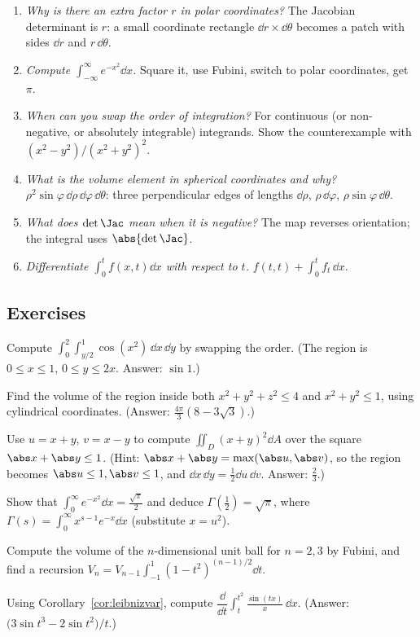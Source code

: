 \begin{interview}
\begin{enumerate}
  \item \emph{Why is there an extra factor $r$ in polar coordinates?} The Jacobian determinant is $r$: a small coordinate rectangle $\dd r\times\dd\theta$ becomes a patch with sides $\dd r$ and $r\,\dd\theta$.
  \item \emph{Compute $\int_{-\infty}^\infty e^{-x^2}\dd x$.} Square it, use Fubini, switch to polar coordinates, get $\pi$.
  \item \emph{When can you swap the order of integration?} For continuous (or non-negative, or absolutely integrable) integrands. Show the counterexample with $(x^2-y^2)/(x^2+y^2)^2$.
  \item \emph{What is the volume element in spherical coordinates and why?} $\rho^2\sin\varphi\,\dd\rho\,\dd\varphi\,\dd\theta$: three perpendicular edges of lengths $\dd\rho$, $\rho\,\dd\varphi$, $\rho\sin\varphi\,\dd\theta$.
  \item \emph{What does $\det\Jac$ mean when it is negative?} The map reverses orientation; the integral uses $\abs{\det\Jac}$.
  \item \emph{Differentiate $\int_0^{t}f(x,t)\dd x$ with respect to $t$.} $f(t,t)+\int_0^tf_t\,\dd x$.
\end{enumerate}
\end{interview}

\subsection*{Exercises}
\begin{exercise}
Compute $\displaystyle\int_0^2\!\!\int_{y/2}^1\cos(x^2)\,\dd x\,\dd y$ by swapping the order. (The region is $0\le x\le1$, $0\le y\le2x$. Answer: $\sin1$.)
\end{exercise}
\begin{exercise}
Find the volume of the region inside both $x^2+y^2+z^2\le4$ and $x^2+y^2\le1$, using cylindrical coordinates. (Answer: $\tfrac{4\pi}3(8-3\sqrt3)$.)
\end{exercise}
\begin{exercise}
Use $u=x+y$, $v=x-y$ to compute $\iint_D(x+y)^2\dd A$ over the square $\abs x+\abs y\le1$. (Hint: $\abs x+\abs y=\max(\abs u,\abs v)$, so the region becomes $\abs u\le1,\abs v\le1$, and $\dd x\,\dd y=\tfrac12\dd u\,\dd v$. Answer: $\tfrac23$.)
\end{exercise}
\begin{exercise}
Show that $\int_0^\infty e^{-x^2}\dd x=\frac{\sqrt\pi}2$ and deduce $\Gamma(\tfrac12)=\sqrt\pi$, where $\Gamma(s)=\int_0^\infty x^{s-1}e^{-x}\dd x$ (substitute $x=u^2$).
\end{exercise}
\begin{exercise}
Compute the volume of the $n$-dimensional unit ball for $n=2,3$ by Fubini, and find a recursion $V_n=V_{n-1}\int_{-1}^1(1-t^2)^{(n-1)/2}\dd t$.
\end{exercise}
\begin{exercise}
Using Corollary~\ref{cor:leibnizvar}, compute $\dfrac{\dd}{\dd t}\displaystyle\int_t^{t^2}\frac{\sin(tx)}x\,\dd x$. (Answer: $\bigl(3\sin t^3-2\sin t^2\bigr)/t$.)
\end{exercise}
